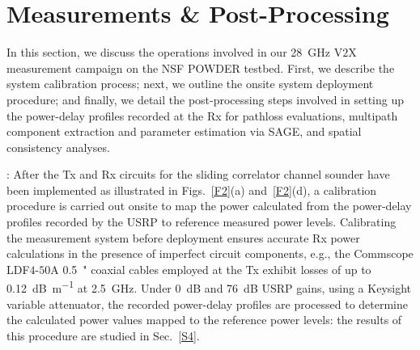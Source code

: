\documentclass[10pt, twocolumn]{IEEEtran}
\begin{document}
\section{Measurements \& Post-Processing}\label{S3}
In this section, we discuss the operations involved in our \SI{28}{\giga\hertz} V$2$X measurement campaign on the NSF POWDER testbed. First, we describe the system calibration process; next, we outline the onsite system deployment procedure; and finally, we detail the post-processing steps involved in setting up the power-delay profiles recorded at the Rx for pathloss evaluations, multipath component extraction and parameter estimation via SAGE, and spatial consistency analyses.

: After the Tx and Rx circuits for the sliding correlator channel sounder have been implemented as illustrated in Figs.~\ref{F2}(a) and~\ref{F2}(d), a calibration procedure is carried out onsite to map the power calculated from the power-delay profiles recorded by the USRP to reference measured power levels. Calibrating the measurement system before deployment ensures accurate Rx power calculations in the presence of imperfect circuit components, e.g., the Commscope LDF$4$-$50$A \SI{0.5}{{"}} coaxial cables employed at the Tx exhibit losses of up to \SI{0.12}{\deci\bel\per\meter} at \SI{2.5}{\giga\hertz}. Under \SI{0}{\deci\bel} and \SI{76}{\deci\bel} USRP gains, using a Keysight variable attenuator, the recorded power-delay profiles are processed to determine the calculated power values mapped to the reference power levels: the results of this procedure are studied in Sec.~\ref{S4}.
\end{document}

